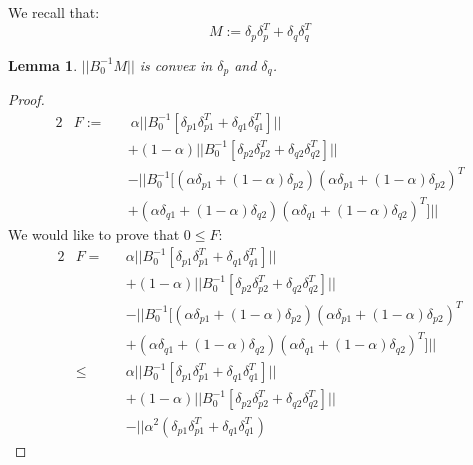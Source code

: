 \documentclass[11pt,twocolumn,varwidth=true,a4paper,fleqn]{article}
\newtheorem{lemma}{Lemma}
\begin{document}
We recall that:
\begin{equation*} 
M:=\delta_p\delta_p^T + \delta_q\delta_q^T
\end{equation*}
\begin{lemma} \label{M}
$||B_0^{-1}M||$ is convex in $\delta_p$
and $\delta_q$.
\end{lemma}
\begin{proof}
\begin{alignat*}{2}
& F:=  && \ \alpha||B_0^{-1}[\delta_{p1}\delta_{p1}^T +
\delta_{q1}\delta_{q1}^T]|| \\
& && + (1-\alpha)||B_0^{-1}[\delta_{p2}\delta_{p2}^T +
\delta_{q2}\delta_{q2}^T]|| \\
& && - ||B_0^{-1}[(\alpha\delta_{p1}+(1-\alpha)\delta_{p2})(\alpha\delta_{p1} +
 (1-\alpha)\delta_{p2})^T  \\
& &&+ (\alpha\delta_{q1}+(1-\alpha)\delta_{q2})(\alpha\delta_{q1} +
 (1-\alpha)\delta_{q2})^T]||  
\end{alignat*}
We would like to prove that $0 \leq F$:
\begin{alignat*}{2}
& F=  && \alpha||B_0^{-1}[\delta_{p1}\delta_{p1}^T + \delta_{q1}\delta_{q1}^T]|| \\
& && + (1-\alpha)||B_0^{-1}[\delta_{p2}\delta_{p2}^T + \delta_{q2}\delta_{q2}^T]|| \\
& && - ||B_0^{-1}[(\alpha\delta_{p1}+(1-\alpha)\delta_{p2})(\alpha\delta_{p1} +  (1-\alpha)\delta_{p2})^T  \\
& && + (\alpha\delta_{q1}+(1-\alpha)\delta_{q2})(\alpha\delta_{q1} +  (1-\alpha)\delta_{q2})^T]||  \\
& \leq && \alpha||B_0^{-1}[\delta_{p1}\delta_{p1}^T +
\delta_{q1}\delta_{q1}^T]|| \\
& && + (1-\alpha)||B_0^{-1}[\delta_{p2}\delta_{p2}^T +
\delta_{q2}\delta_{q2}^T]|| \\
& && - || \alpha^2(\delta_{p1}\delta_{p1}^T + \delta_{q1}\delta_{q1}^T) 

\end{alignat*}
\end{proof}
\end{document}

